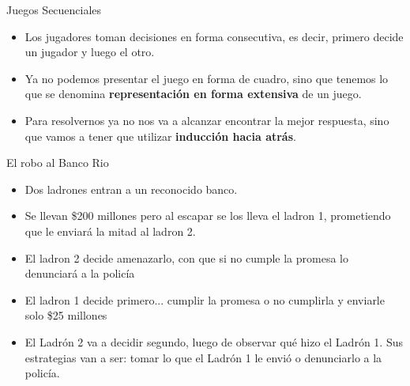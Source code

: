 \documentclass{beamer}
\begin{document}
\begin{frame}{Juegos Secuenciales}
    \begin{itemize}
        \item Los jugadores toman decisiones en forma consecutiva, es decir, primero decide un jugador y luego el otro.
        \item Ya no podemos presentar el juego en forma de cuadro, sino que tenemos lo que se denomina \textbf{representación en forma extensiva} de un juego.
        \item Para resolvernos ya no nos va a alcanzar encontrar la mejor respuesta, sino que vamos a tener que utilizar \textbf{inducción hacia atrás}.
    \end{itemize}
\end{frame}

\begin{frame}{El robo al Banco Rio}
    \begin{itemize}
        \item Dos ladrones entran a un reconocido banco.
        \item Se llevan \$200 millones pero al escapar se los lleva el ladron 1, prometiendo que le enviará la mitad al ladron 2.
        \item El ladron 2 decide amenazarlo, con que si no cumple la promesa lo denunciará a la policía
        \item El ladron 1 decide primero... cumplir la promesa o no cumplirla y enviarle solo \$25 millones 
        \item El Ladrón 2 va a decidir segundo, luego de observar qué hizo el Ladrón 1. Sus estrategias van a ser: tomar lo que el Ladrón 1 le envió o denunciarlo a la policía.
    \end{itemize}
\end{frame}
\end{document}
